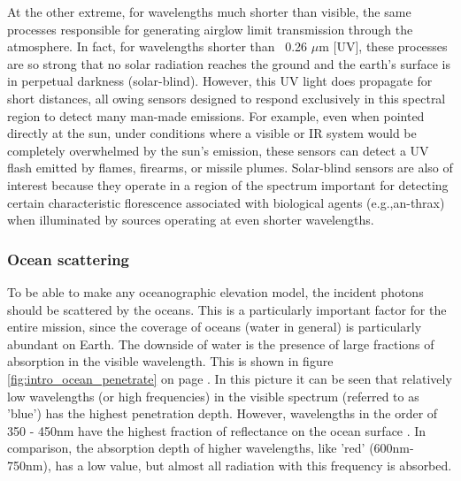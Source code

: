 At the other extreme, for wavelengths much shorter than visible, the same processes responsible for generating airglow limit transmission through the atmosphere. In fact, for wavelengths shorter than ~0.26 $\mu$m [\ac{UV}], these processes are so strong that no solar radiation reaches the ground and the earth's surface is in perpetual darkness (solar-blind). However, this \acs{UV} light does propagate for short distances, all owing sensors designed to respond exclusively in this spectral region to detect many man-made emissions. For example, even when pointed directly at the sun, under conditions where a visible or \ac{IR} system would be completely overwhelmed by the sun's emission, these sensors can detect a UV flash emitted by flames, firearms, or missile plumes. Solar-blind sensors are also of interest because they operate in a region of the spectrum important for detecting certain characteristic florescence associated with biological agents (e.g.,an-thrax) when illuminated by sources operating at even shorter wavelengths. 

\subsubsection{Ocean scattering}
\label{introOcean}
To be able to make any oceanographic elevation model, the incident photons should be scattered by the oceans. This is a particularly important factor for the entire mission, since the coverage of oceans (water in general) is particularly abundant on Earth. The downside of water is the presence of large fractions of absorption in the visible wavelength. This is shown in figure \ref{fig:intro_ocean_penetrate} on page \pageref{fig:intro_ocean_penetrate}. In this picture it can be seen that relatively low wavelengths (or high frequencies) in the visible spectrum (referred to as 'blue') has the highest penetration depth. However, wavelengths in the order of 350 - 450nm have the highest fraction of reflectance on the ocean surface \cite{ocean_scattering}. In comparison, the absorption depth of higher wavelengths, like 'red' (600nm-750nm), has a low value, but almost all radiation with this frequency is absorbed. 


